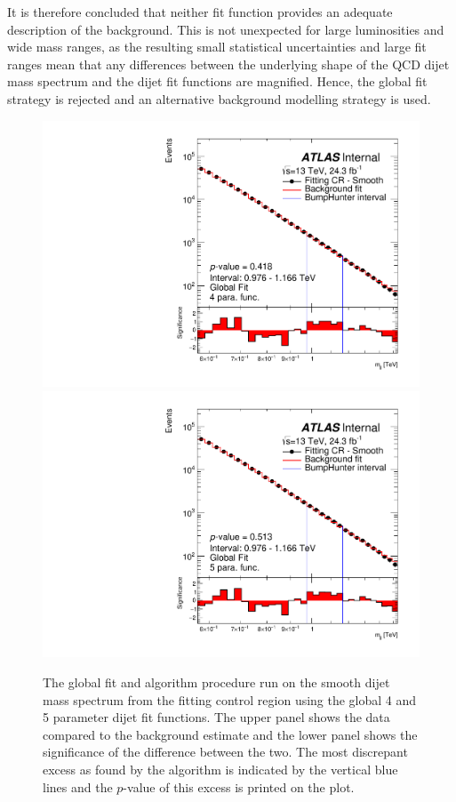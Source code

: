 It is therefore concluded that neither fit function provides an adequate description of the background.
This is not unexpected for large luminosities and wide mass ranges,
as the resulting small statistical uncertainties and large fit ranges mean that any
differences between the underlying shape of the QCD dijet mass spectrum
and the dijet fit functions are magnified.
Hence, the global fit strategy is rejected and an alternative background modelling strategy is used.

\begin{figure}[!htb]
\captionsetup[subfigure]{aboveskip=0pt,justification=centering}
\centering
{} {
  \includegraphics[width=0.45\linewidth, angle=0]{figs/Dibjet/LowMass/FitStudy_min566/globalFit_lm_bH_4para.pdf}
}
 {
  \includegraphics[width=0.45\linewidth, angle=0]{figs/Dibjet/LowMass/FitStudy_min566/globalFit_lm_bH_5para.pdf}
}

\caption{\label{fig:bhFit_lm_global}
  The global fit and \bh{} algorithm procedure run on the smooth dijet mass spectrum from the \lm{} fitting control region
  using the global 4 and 5 parameter dijet fit functions.
  The upper panel shows the data compared to the background estimate and the lower panel shows the significance of the difference between the two.
  The most discrepant excess as found by the \bh{} algorithm is indicated by the vertical blue lines and the \mbox{$p$-value} of this excess is printed on the plot. }
\end{figure}


